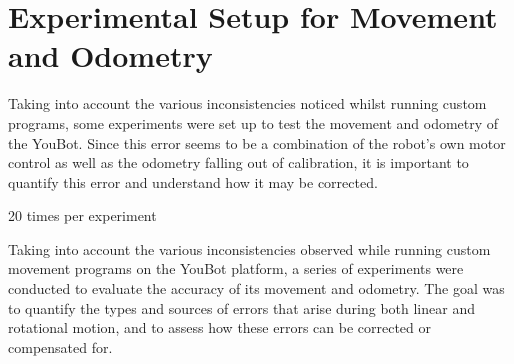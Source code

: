 \documentclass[a4paper, 12pt]{article}
\newif\ifshownotes
\newcommand{\notes}[1]{\ifshownotes\textcolor{blue}{#1}\fi}
\begin{document}
    
    \section{Experimental Setup for Movement and Odometry}

    \notes{here, ill discuss the experimental setup for testing movement and odometry.  this should include the two experiments of moving linearly and rotating, and discuss how error is calculated. probably discuss negative feedback and PID control as well, random, percentage, consistent error, etc.}

    Taking into account the various inconsistencies noticed whilst running custom programs, some experiments were set up to test the movement and odometry of the YouBot. Since this error seems to be a combination of the robot's own motor control as well as the odometry falling out of calibration, it is important to quantify this error and understand how it may be corrected. 



    \notes{different speeds? proportional or fixed error? does the odometry also drift?}

    20 times per experiment

    Taking into account the various inconsistencies observed while running custom movement programs on the YouBot platform, a series of experiments were conducted to evaluate the accuracy of its movement and odometry. The goal was to quantify the types and sources of errors that arise during both linear and rotational motion, and to assess how these errors can be corrected or compensated for.

\end{document}

